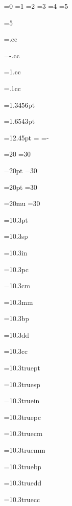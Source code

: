 
=0
=1
=2
=3
=4
=5

=5
\showthe{}

=.cc
\showthe{}

=-.cc
\showthe{}

=1.cc
\showthe{}

=.1cc
\showthe{}

=1.3456pt
\showthe{}

=1.6543pt
\showthe{}

=12.45pt
\showthe{}
=
\showthe{}
=-
\showthe{}

=20
=30
\showthe{}

=20pt
=30
\showthe{}

=20pt
=30
\showthe{}

=20mu
=30
\showthe{}

=10.3pt
\showthe{}

=10.3sp
\showthe{}

=10.3in
\showthe{}

=10.3pc
\showthe{}

=10.3cm
\showthe{}

=10.3mm
\showthe{}

=10.3bp
\showthe{}

=10.3dd
\showthe{}

=10.3cc
\showthe{}


=10.3truept
\showthe{}

=10.3truesp
\showthe{}

=10.3truein
\showthe{}

=10.3truepc
\showthe{}

=10.3truecm
\showthe{}

=10.3truemm
\showthe{}

=10.3truebp
\showthe{}

=10.3truedd
\showthe{}

=10.3truecc
\showthe{}

